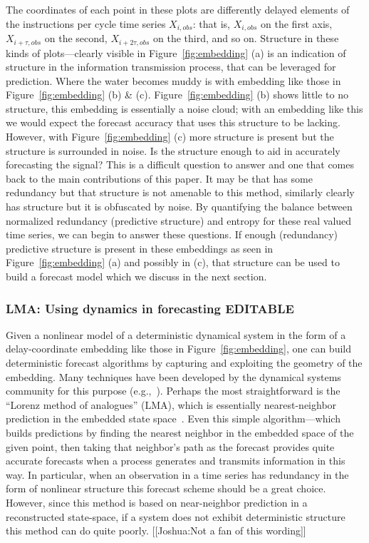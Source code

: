 The coordinates of each point in these plots are differently delayed
elements of the instructions per cycle time series
$X_{i,obs}$: that is, $X_{i,obs}$ on the first axis, $X_{i+\tau,obs}$ on the second,
$X_{i+2\tau,obs}$ on the third, and so on.
Structure in these kinds of plots---clearly visible in
Figure~\ref{fig:embedding} (a) is an indication of
structure in the information transmission process, that can be leveraged for prediction. Where the water becomes muddy is with embedding like those in Figure~\ref{fig:embedding} (b) \& (c). Figure~\ref{fig:embedding} (b) shows little to no structure, this embedding is essentially a noise cloud; with an embedding like this we would expect the forecast accuracy that uses this structure to be lacking. However, with Figure~\ref{fig:embedding} (c) more structure is present but the structure is surrounded in noise. Is the structure enough to aid in accurately forecasting the signal? This is a difficult question to answer and one that comes back to the main contributions of this paper. It may be that \gcc has some redundancy but that structure is not amenable to this method, similarly \svdfive clearly has structure but it is obfuscated by noise. By quantifying the balance between normalized redundancy (predictive structure) and entropy for these real valued time series, we can begin to answer these questions.  If enough (redundancy) predictive structure is present in these embeddings as seen in Figure~\ref{fig:embedding} (a) and possibly in (c), that structure can be used to build a forecast model which we discuss in the next section.
 \subsubsection{LMA: Using dynamics in forecasting {\color{blue} EDITABLE}}

Given a nonlinear model of a deterministic dynamical system in the
form of a delay-coordinate embedding like those in Figure~\ref{fig:embedding},
one can build deterministic forecast algorithms by capturing and
exploiting the geometry of the embedding.  Many techniques have been
developed by the dynamical systems community for this purpose
(e.g.,~\cite{weigend-book,casdagli-eubank92,Smith199250}).  Perhaps the most straightforward
is the ``Lorenz method of analogues'' (LMA), which is essentially
nearest-neighbor prediction in the embedded state
space~\cite{lorenz-analogues}.  Even this simple algorithm---which
builds predictions by finding the nearest neighbor in the embedded space of the given point, then taking that neighbor's path as the
forecast provides quite accurate forecasts when a process generates and transmits information in this way. In particular, when an observation in a time series has redundancy in the form of nonlinear structure this forecast scheme should be a great choice. However, since this method is based on near-neighbor prediction in a reconstructed state-space, if a system does not exhibit deterministic structure this method can do quite poorly. {\color{red}[[Joshua:Not a fan of this wording]]}

